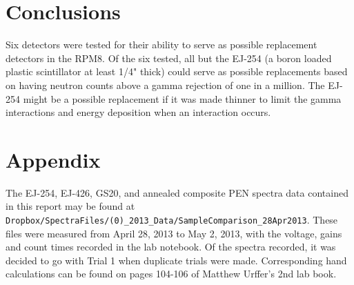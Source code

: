 \documentclass[draftcls,onecolumn]{IEEEtran}
\begin{document}
\section{Conclusions}
Six detectors were tested for their ability to serve as possible replacement detectors in the RPM8.
Of the six tested, all but the EJ-254 (a boron loaded plastic scintillator at least 1/4" thick) could serve as possible replacements based on having neutron counts above a gamma rejection of one in a million.
The EJ-254 might be a possible replacement if it was made thinner to limit the gamma interactions and energy deposition when an interaction occurs.
\section{Appendix}
The EJ-254, EJ-426, GS20, and annealed composite PEN spectra data contained in this report may be found at \verb+Dropbox/SpectraFiles/(0)_2013_Data/SampleComparison_28Apr2013+.
These files were measured from April 28, 2013 to May 2, 2013, with the voltage, gains and count times recorded in the lab notebook. 
Of the spectra recorded, it was decided to go with Trial 1 when duplicate trials were made.
Corresponding hand calculations can be found on pages 104-106 of Matthew Urffer's 2nd lab book.
\end{document}
